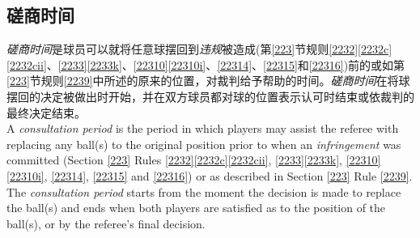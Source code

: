 \subsection{磋商时间}

\noindent \textit{磋商时间}是球员可以就将任意球摆回到\textit{违规}被造成(第\ref{223}节规则\ref{2232}\ref{2232c}\ref{2232cii}、\ref{2233}\ref{2233k}、\ref{22310}\ref{22310i}、\ref{22314}、\ref{22315}和\ref{22316})前的或如第\ref{223}节规则\ref{2239}中所述的原来的位置，对裁判给予帮助的时间。\textit{磋商时间}在将球摆回的决定被做出时开始，并在双方球员都对球的位置表示认可时结束或依裁判的最终决定结束。\\
A \textit{consultation period} is the period in which players may assist the referee with replacing any ball(s) to the original position prior to when an \textit{infringement} was committed (Section \ref{223} Rules \ref{2232}\ref{2232c}\ref{2232cii}, \ref{2233}\ref{2233k}, \ref{22310}\ref{22310i}, \ref{22314}, \ref{22315} and \ref{22316}) or as described in Section \ref{223} Rule \ref{2239}. The \textit{consultation period} starts from the moment the decision is made to replace the ball(s) and ends when both players are satisfied as to the position of the ball(s), or by the referee's final decision.
